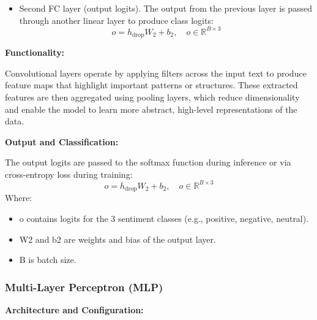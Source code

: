 \documentclass{article}
\begin{document}
\begin{itemize}
\begin{itemize}
\item Second FC layer (output logits). The output from the previous layer is passed through another linear layer to produce class logits:
\[
o = h_{\text{drop}}W_2 + b_2, \quad o \in \mathbb{R}^{B \times 3}
\]

\end{itemize}
\end{itemize}

\textbf{Functionality:}

Convolutional layers operate by applying filters across the input text to produce feature maps that highlight important patterns or structures. These extracted features are then aggregated using pooling layers, which reduce dimensionality and enable the model to learn more abstract, high-level representations of the data.


\textbf{Output and Classification:}

The output logits are passed to the softmax function during inference or via cross-entropy loss during training:
\[
o = h_{\text{drop}}W_2 + b_2, \quad o \in \mathbb{R}^{B \times 3}
\]
Where:
\begin{itemize}
\item o contains logits for the 3 sentiment classes (e.g., positive, negative, neutral).
\item W2 and b2 are weights and bias of the output layer.
\item B is batch size.
\end{itemize}

\subsubsection{Multi-Layer Perceptron (MLP)}

\textbf{Architecture and Configuration:}
\end{document}
